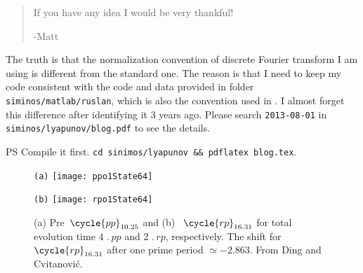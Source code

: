 \begin{description}
\begin{quotation}
  If you have any idea I would be very thankful!

  -Matt
\end{quotation}

The truth is that the normalization convention of
discrete Fourier transform I am using is
different from the standard one. The reason is that I need to
keep my code consistent with the code and data provided in folder
\texttt{siminos/matlab/ruslan}, which is also the convention used
in .
I almost forget this difference
after identifying it 3 years ago.
Please search \texttt{2013-08-01} in \texttt{siminos/lyapunov/blog.pdf}
to see the details.

PS Compile it first. \texttt{cd sinimos/lyapunov \&\& pdflatex blog.tex}.

\begin{figure}[h]
  \centering
  \begin{minipage}{.32\textwidth}
    \centering \small{\texttt{(a)}}
    \texttt{[image: ppo1State64]}
  \end{minipage}
  \begin{minipage}{.32\textwidth}
    \centering \small{\texttt{(b)}}
    \texttt{[image: rpo1State64]}
  \end{minipage}%
  \caption{ %
    (a) Pre\po\ $\cycle{pp}_{10.25}$ and
    (b) \rpo\ $\cycle{rp}_{16.31}$ for total evolution time
    $4\,\period{pp}$ and $2\,\period{rp}$, respectively. The  shift
    for $\cycle{rp}_{16.31}$ after one prime period $\simeq-2.863$.
    From Ding and Cvitanovi{\'c}.
  }
  \label{fig:ppo1rpo1}
\end{figure}



\end{description}
